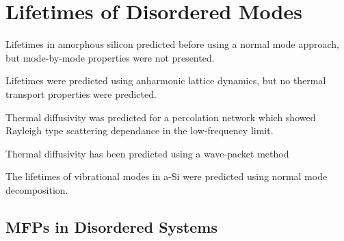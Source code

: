 \documentclass[aps,prb,preprint,superscriptaddress,amsmath,amssymb,floatfix]{revtex4}
\begin{document}

\section{\label{S:Lifetimes}Lifetimes of Disordered Modes}
Lifetimes in amorphous silicon predicted before using a normal mode 
approach, but mode-by-mode properties were not presented.
\cite{bickham_calculation_1998}

Lifetimes were predicted using anharmonic lattice dynamics, but no thermal 
transport properties were predicted.\cite{fabian_anharmonic_1996}

Thermal diffusivity was predicted for a percolation network which showed 
Rayleigh type scattering dependance in the low-frequency limit.
\cite{sheng_heat_1991}

Thermal diffusivity has been predicted using a wave-packet method

The lifetimes of vibrational modes in a-Si were predicted using normal 
mode decomposition.\cite{he_heat_2011}

\subsection{\label{S:Lifetimes:}MFPs in Disordered Systems}

\end{document}
